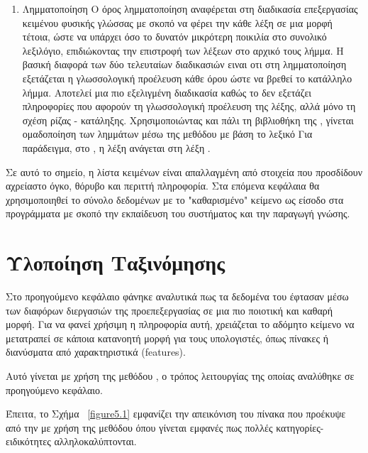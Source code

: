 \begin{enumerate}
    \item Λημματοποίηση 
    Ο όρος λημματοποίηση αναφέρεται στη διαδικασία επεξεργασίας κειμένου φυσικής γλώσσας με σκοπό να φέρει την κάθε λέξη σε μια μορφή τέτοια, ώστε να υπάρχει όσο το δυνατόν μικρότερη ποικιλία στο συνολικό λεξιλόγιο, επιδιώκοντας την επιστροφή των λέξεων στο αρχικό τους λήμμα. Η βασική διαφορά των δύο τελευταίων διαδικασιών ειναι οτι στη λημματοποίηση εξετάζεται η γλωσσολογική προέλευση κάθε όρου ώστε να βρεθεί το κατάλληλο λήμμα. Αποτελεί μια πιο εξελιγμένη διαδικασία καθώς το  δεν εξετάζει πληροφορίες που αφορούν τη γλωσσολογική προέλευση της λέξης, αλλά μόνο τη σχέση ρίζας - κατάληξης. Χρησιμοποιώντας και πάλι τη βιβλιοθήκη  της , γίνεται ομαδοποίηση των λημμάτων μέσω της μεθόδου  με βάση το λεξικό  Για παράδειγμα, στο , η λέξη  ανάγεται στη λέξη .
\end{enumerate}

Σε αυτό το σημείο, η λίστα κειμένων είναι απαλλαγμένη από στοιχεία που προσδίδουν αχρείαστο όγκο, θόρυβο και περιττή πληροφορία. Στα επόμενα κεφάλαια θα χρησιμοποιηθεί το σύνολο δεδομένων με το "καθαρισμένο" κείμενο ως είσοδο στα προγράμματα με σκοπό την εκπαίδευση του συστήματος και την παραγωγή γνώσης.

\clearpage
\section{Υλοποίηση Ταξινόμησης}
Στο προηγούμενο κεφάλαιο φάνηκε αναλυτικά πως τα δεδομένα του  έφτασαν μέσω των διαφόρων διεργασιών της προεπεξεργασίας σε μια πιο ποιοτική και καθαρή μορφή. Για να φανεί χρήσιμη η πληροφορία αυτή, χρειάζεται το αδόμητο κείμενο να μετατραπεί σε κάποια κατανοητή μορφή για τους υπολογιστές, όπως πίνακες ή διανύσματα από χαρακτηριστικά (features).

Αυτό γίνεται με χρήση της μεθόδου , ο τρόπος λειτουργίας της οποίας αναλύθηκε σε προηγούμενο κεφάλαιο. 

Έπειτα, το Σχήμα~ \ref{figure5.1} εμφανίζει την απεικόνιση του πίνακα που προέκυψε από την  με χρήση της μεθόδου  όπου γίνεται εμφανές πως πολλές κατηγορίες-ειδικότητες αλληλοκαλύπτονται.

